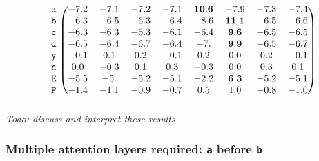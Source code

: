 \documentclass{article}
\newcommand{\ta}{\mathtt{a}}
\newcommand{\tb}{\mathtt{b}}
\newcommand{\tc}{\mathtt{c}}
\newcommand{\td}{\mathtt{d}}
\newcommand{\tn}{\mathtt{n}}
\newcommand{\ty}{\mathtt{y}}
\newcommand{\tE}{\mathtt{E}}
\newcommand{\tP}{\mathtt{P}}
\newcommand{\todo}[1]{\emph{Todo: #1}}
\begin{document}
\begin{displaymath}
\begin{aligned}
\begin{blockarray}{ccccccccc}
\begin{block}{r(cccccccc)}
        \ta & -7.2 & -7.1 & -7.2 & -7.1 & \mathbf{10.6} & -7.9 & -7.3 & -7.4 \\
        \tb & -6.3 & -6.5 & -6.3 & -6.4 & -8.6 & \mathbf{11.1} & -6.5 & -6.6 \\
        \tc & -6.3 & -6.3 & -6.3 & -6.1 & -6.4 & \mathbf{9.6} & -6.5 & -6.5 \\
        \td & -6.5 & -6.4 & -6.7 & -6.4 & -7. & \mathbf{9.9} & -6.5 & -6.7 \\
        \ty & -0.1 & 0.1 & 0.2 & -0.1 & 0.2 & 0.0 & 0.2 & -0.1 \\
        \tn & 0.0 & -0.3 & 0.1 & 0.3 & -0.3 & 0.0 & 0.3 & 0.1 \\
        \tE & -5.5 & -5. & -5.2 & -5.1 & -2.2 & \mathbf{6.3} & -5.2 & -5.1 \\
        \tP & -1.4 & -1.1 & -0.9 & -0.7 & 0.5 & 1.0 & -0.8 & -1.0 \\      \end{block}
    \end{blockarray} \\    
  \end{aligned}
\end{displaymath}
\todo{discuss and interpret these results}

\subsubsection*{Multiple attention layers required: \texttt{a} before \texttt{b}}
\end{document}
